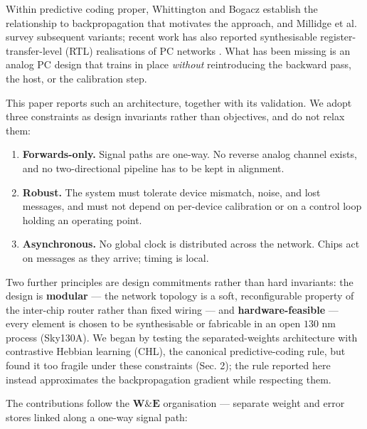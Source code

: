 \documentclass[11pt]{article}
\begin{document}
Within predictive coding proper, Whittington and Bogacz
\cite{whittington2017approximation} establish the relationship to
backpropagation that motivates the approach, and Millidge et al.
\cite{millidge2022predictive} survey subsequent variants; recent work
has also reported synthesisable register-transfer-level (RTL)
realisations of PC networks \cite{oh2026synthesizable}. What has been
missing is an analog PC design that trains in place \emph{without}
reintroducing the backward pass, the host, or the calibration step.

This paper reports such an architecture, together with its validation.
We adopt three constraints as design invariants rather than objectives,
and do not relax them:

\begin{enumerate}
\def\labelenumi{\arabic{enumi}.}
\item
  \textbf{Forwards-only.} Signal paths are one-way. No reverse analog
  channel exists, and no two-directional pipeline has to be kept in
  alignment.
\item
  \textbf{Robust.} The system must tolerate device mismatch, noise, and
  lost messages, and must not depend on per-device calibration or on a
  control loop holding an operating point.
\item
  \textbf{Asynchronous.} No global clock is distributed across the
  network. Chips act on messages as they arrive; timing is local.
\end{enumerate}

Two further principles are design commitments rather than hard
invariants: the design is \textbf{modular} --- the network topology is a
soft, reconfigurable property of the inter-chip router rather than fixed
wiring --- and \textbf{hardware-feasible} --- every element is chosen to
be synthesisable or fabricable in an open \(130\) nm process (Sky130A).
We began by testing the separated-weights architecture with contrastive
Hebbian learning (CHL), the canonical predictive-coding rule, but found
it too fragile under these constraints (Sec. 2); the rule reported here
instead approximates the backpropagation gradient while respecting them.

The contributions follow the \(\bm W\&\bm E\) organisation --- separate
weight and error stores linked along a one-way signal path:
\end{document}
